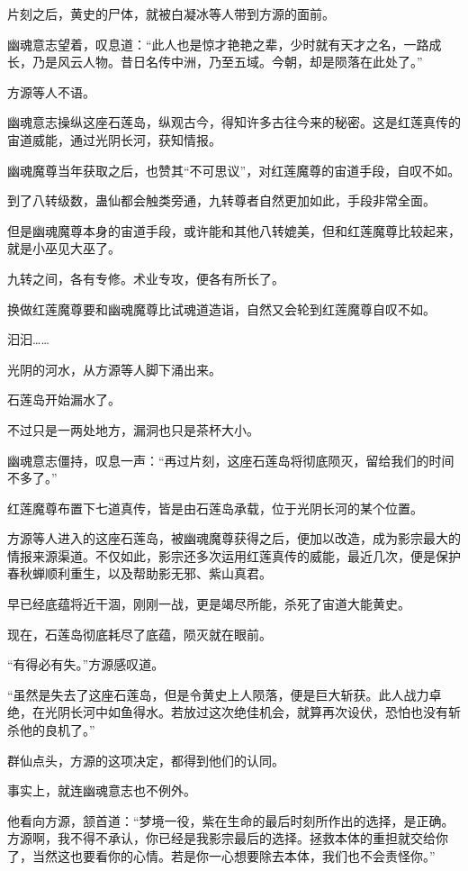 
\begin{this_body}

片刻之后，黄史的尸体，就被白凝冰等人带到方源的面前。

幽魂意志望着，叹息道：“此人也是惊才艳艳之辈，少时就有天才之名，一路成长，乃是风云人物。昔日名传中洲，乃至五域。今朝，却是陨落在此处了。”

方源等人不语。

幽魂意志操纵这座石莲岛，纵观古今，得知许多古往今来的秘密。这是红莲真传的宙道威能，通过光阴长河，获知情报。

幽魂魔尊当年获取之后，也赞其“不可思议”，对红莲魔尊的宙道手段，自叹不如。

到了八转级数，蛊仙都会触类旁通，九转尊者自然更加如此，手段非常全面。

但是幽魂魔尊本身的宙道手段，或许能和其他八转媲美，但和红莲魔尊比较起来，就是小巫见大巫了。

九转之间，各有专修。术业专攻，便各有所长了。

换做红莲魔尊要和幽魂魔尊比试魂道造诣，自然又会轮到红莲魔尊自叹不如。

汩汩……

光阴的河水，从方源等人脚下涌出来。

石莲岛开始漏水了。

不过只是一两处地方，漏洞也只是茶杯大小。

幽魂意志僵持，叹息一声：“再过片刻，这座石莲岛将彻底陨灭，留给我们的时间不多了。”

红莲魔尊布置下七道真传，皆是由石莲岛承载，位于光阴长河的某个位置。

方源等人进入的这座石莲岛，被幽魂魔尊获得之后，便加以改造，成为影宗最大的情报来源渠道。不仅如此，影宗还多次运用红莲真传的威能，最近几次，便是保护春秋蝉顺利重生，以及帮助影无邪、紫山真君。

早已经底蕴将近干涸，刚刚一战，更是竭尽所能，杀死了宙道大能黄史。

现在，石莲岛彻底耗尽了底蕴，陨灭就在眼前。

“有得必有失。”方源感叹道。

“虽然是失去了这座石莲岛，但是令黄史上人陨落，便是巨大斩获。此人战力卓绝，在光阴长河中如鱼得水。若放过这次绝佳机会，就算再次设伏，恐怕也没有斩杀他的良机了。”

群仙点头，方源的这项决定，都得到他们的认同。

事实上，就连幽魂意志也不例外。

他看向方源，颔首道：“梦境一役，紫在生命的最后时刻所作出的选择，是正确。方源啊，我不得不承认，你已经是我影宗最后的选择。拯救本体的重担就交给你了，当然这也要看你的心情。若是你一心想要除去本体，我们也不会责怪你。”


\end{this_body}
